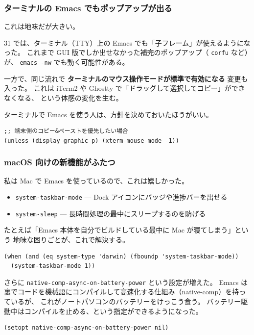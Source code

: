 \documentclass[11pt]{article}
\begin{document}
\subsubsection{ターミナルの Emacs でもポップアップが出る}
\label{sec:org420e835}

これは地味だが大きい。

31 では、ターミナル（TTY）上の Emacs でも「子フレーム」が使えるようになった。
これまで GUI 版でしか出せなかった補完のポップアップ（ \texttt{corfu} など）が、
\texttt{emacs -nw} でも動く可能性がある。

一方で、同じ流れで \textbf{ターミナルのマウス操作モードが標準で有効になる} 変更も入った。
これは iTerm2 や Ghostty で「ドラッグして選択してコピー」ができなくなる、
という体感の変化を生む。

ターミナルで Emacs を使う人は、方針を決めておいたほうがいい。

\begin{verbatim}
;; 端末側のコピー&ペーストを優先したい場合
(unless (display-graphic-p) (xterm-mouse-mode -1))
\end{verbatim}
\subsubsection{macOS 向けの新機能がふたつ}
\label{sec:orgfb5cf3f}

私は Mac で Emacs を使っているので、これは嬉しかった。

\begin{itemize}
\item \texttt{system-taskbar-mode} — Dock アイコンにバッジや進捗バーを出せる
\item \texttt{system-sleep} — 長時間処理の最中にスリープするのを防げる
\end{itemize}

たとえば「Emacs 本体を自分でビルドしている最中に Mac が寝てしまう」という
地味な困りごとが、これで解決する。

\begin{verbatim}
(when (and (eq system-type 'darwin) (fboundp 'system-taskbar-mode))
  (system-taskbar-mode 1))
\end{verbatim}

さらに \texttt{native-comp-async-on-battery-power} という設定が増えた。
Emacs は裏でコードを機械語にコンパイルして高速化する仕組み（native-comp）を持っているが、
これがノートパソコンのバッテリーをけっこう食う。
バッテリー駆動中はコンパイルを止める、という指定ができるようになった。

\begin{verbatim}
(setopt native-comp-async-on-battery-power nil)
\end{verbatim}
\end{document}
